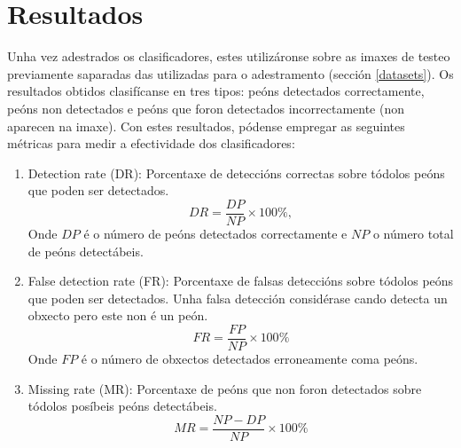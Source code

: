 \documentclass[galician]{./head/uvigo-tfg}
\begin{document}
    \section{Resultados}
    \par Unha vez adestrados os clasificadores, estes utilizáronse sobre as imaxes de testeo previamente saparadas das utilizadas para o adestramento (sección \ref{datasets}). Os resultados obtidos clasifícanse en tres tipos: peóns detectados correctamente, peóns non detectados e peóns que foron detectados incorrectamente (non aparecen na imaxe).
    Con estes resultados, pódense empregar as seguintes métricas para medir a efectividade dos clasificadores\cite{metrics}:
    \begin{enumerate}
        \item Detection rate (DR): Porcentaxe de deteccións correctas sobre tódolos peóns que poden ser detectados.
        \begin{equation}
            DR=\dfrac{DP}{NP} \times 100 \%,
        \end{equation}
        Onde $DP$ é o número de peóns detectados correctamente e $NP$ o número total de peóns detectábeis.
        \item False detection rate (FR): Porcentaxe de falsas deteccións sobre tódolos peóns que poden ser detectados. Unha falsa detección considérase cando detecta un obxecto pero este non é un peón.
        \begin{equation}
            FR = \dfrac{FP}{NP} \times 100 \%
        \end{equation}
        Onde $FP$ é o número de obxectos detectados erroneamente coma peóns.
        \item Missing rate (MR): Porcentaxe de peóns que non foron detectados sobre tódolos posíbeis peóns detectábeis.
        \begin{equation}
            MR = \dfrac{NP - DP}{NP} \times 100 \%
        \end{equation}
    \end{enumerate}
\end{document}
